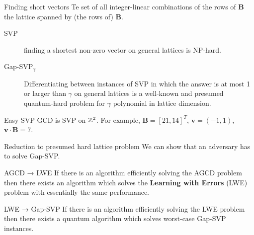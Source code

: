 \documentclass[presentation,smaller]{beamer}
\renewcommand{\vec}[1]{\ensuremath{\mathbf{#1}}\xspace}
\begin{document}
\begin{frame}[label={sec:org0f46ccb}]{Finding short vectors}
Te set of all integer-linear combinations of the rows of \(\vec{B}\) the \alert{lattice} spanned by (the rows of) \(\vec{B}\).

\begin{description}
\item[{SVP}] finding a \alert{shortest} non-zero vector on \alert{general} lattices is NP-hard.

\item[{Gap-SVP\(_\gamma\)}] Differentiating between instances of SVP in which the answer is at most 1 or larger than \(\gamma\) on \alert{general} lattices is a well-known and presumed quantum-hard problem for \(\gamma\) polynomial in lattice dimension.
\end{description}

\begin{block}{Easy SVP}
GCD is SVP on \(\mathbb{Z}^2\). For example, \(\vec{B} = {[21, 14]}^T\), \(\vec{v} = (-1,1)\), \(\vec{v} ⋅\vec{B} = 7\).
\end{block}
\end{frame}

\begin{frame}[label={sec:org99f3910}]{Reduction to presumed hard lattice problem}
We can show that an adversary \alert{has} to solve Gap-SVP.

\begin{block}{AGCD → LWE}
If there is an algorithm efficiently solving the AGCD problem then there exists an algorithm which solves the \textbf{Learning with Errors} (LWE) problem with essentially the same performance.  
\end{block}

\begin{block}{LWE → Gap-SVP}
If there is an algorithm efficiently solving the LWE problem then there exists a quantum algorithm which solves worst-case Gap-SVP instances.
\end{block}
\end{frame}
\end{document}
